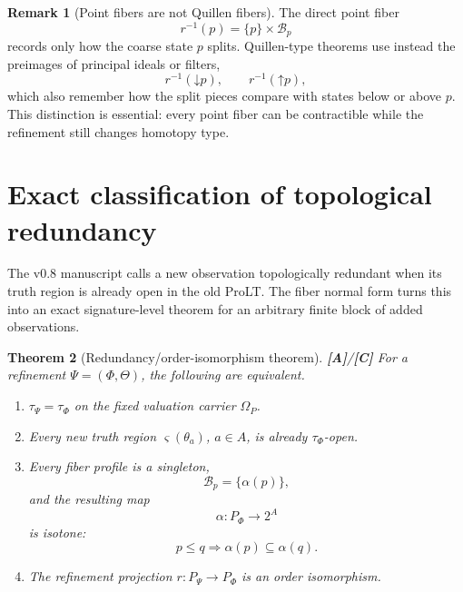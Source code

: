 \documentclass[11pt]{article}
\newtheorem{theorem}{Theorem}[section]
\theoremstyle{definition}
\newtheorem{remark}[theorem]{Remark}
\newcommand{\Om}{\Omega_P}
\newcommand{\truth}{\varsigma}
\newcommand{\statusA}{\textbf{[A]}}
\newcommand{\statusC}{\textbf{[C]}}
\newcommand{\down}{\mathord\downarrow}
\newcommand{\up}{\mathord\uparrow}
\begin{document}
\begin{remark}[Point fibers are not Quillen fibers]\label{rem:pointfiber}
The direct point fiber
\[
r^{-1}(p)=\{p\}\times\mathcal B_p
\]
records only how the coarse state \(p\) splits. Quillen-type theorems use instead the preimages of principal ideals or filters,
\[
r^{-1}(\down p),\qquad r^{-1}(\up p),
\]
which also remember how the split pieces compare with states below or above \(p\). This distinction is essential: every point fiber can be contractible while the refinement still changes homotopy type.
\end{remark}

\section{Exact classification of topological redundancy}

The v0.8 manuscript calls a new observation topologically redundant when its truth region is already open in the old ProLT. The fiber normal form turns this into an exact signature-level theorem for an arbitrary finite block of added observations.

\begin{theorem}[Redundancy/order-isomorphism theorem]\label{thm:redundancy}
\statusA/\statusC\;
For a refinement \(\Psi=(\Phi,\Theta)\), the following are equivalent.
\begin{enumerate}[label=(\roman*)]
\item \(\tau_\Psi=\tau_\Phi\) on the fixed valuation carrier \(\Om\).
\item Every new truth region \(\truth(\theta_a)\), \(a\in A\), is already \(\tau_\Phi\)-open.
\item Every fiber profile is a singleton,
\[
\mathcal B_p=\{\alpha(p)\},
\]
and the resulting map
\[
\alpha:P_\Phi\to2^A
\]
is isotone:
\[
p\le q\Longrightarrow\alpha(p)\subseteq\alpha(q).
\]
\item The refinement projection \(r:P_\Psi\to P_\Phi\) is an order isomorphism.
\end{enumerate}
\end{theorem}
\end{document}
